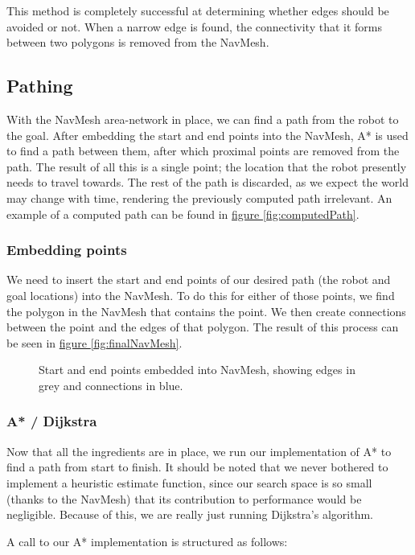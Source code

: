 \documentclass[10pt, abstracton]{scrartcl}
\newcommand{\fref}[1]{\hyperref[#1]{figure \vref{#1}}}
\begin{document}
This method is completely successful at determining whether edges should be avoided or not. When a narrow edge is found, the connectivity that it forms between two polygons is removed from the NavMesh.

\subsection{Pathing}
With the NavMesh area-network in place, we can find a path from the robot to the goal. After embedding the start and end points into the NavMesh, A* is used to find a path between them, after which proximal points are removed from the path. The result of all this is a single point; the location that the robot presently needs to travel towards. The rest of the path is discarded, as we expect the world may change with time, rendering the previously computed path irrelevant. An example of a computed path can be found in \fref{fig:computedPath}.

\subsubsection{Embedding points}
We need to insert the start and end points of our desired path (the robot and goal locations) into the NavMesh. To do this for either of those points, we find the polygon in the NavMesh that contains the point. We then create connections between the point and the edges of that polygon. The result of this process can be seen in \fref{fig:finalNavMesh}.

\begin{figure}
	\centering
	
	\caption{\small Start and end points embedded into NavMesh, showing edges in grey and connections in blue.}
	\label{fig:finalNavMesh}
\end{figure}

\subsubsection{A* / Dijkstra}

Now that all the ingredients are in place, we run our implementation of A* to find a path from start to finish. It should be noted that we never bothered to implement a heuristic estimate function, since our search space is so small (thanks to the NavMesh) that its contribution to performance would be negligible. Because of this, we are really just running Dijkstra's algorithm.

A call to our A* implementation is structured as follows:
\end{document}
